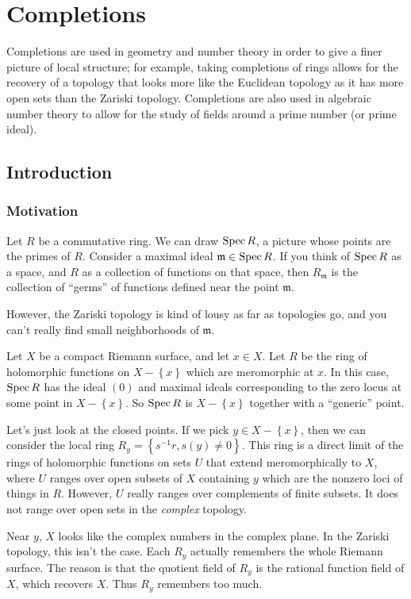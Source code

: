 \chapter{Completions}
\label{completions}

Completions are used in geometry and number theory in order to give a finer picture of local structure; for example, taking completions of rings allows for the recovery of a topology that looks more like the Euclidean topology as it has more open sets than the Zariski topology. Completions are also used in algebraic number theory to allow for the study of fields around a prime number (or prime ideal). 

\section{Introduction}

\subsection{Motivation}
Let $R$ be a commutative ring. We can draw $\operatorname{Spec} R$, a picture whose
points are the primes of $R$. Consider a maximal ideal $\mathfrak{m} \in \operatorname{Spec}
R$. If you think of $\operatorname{Spec} R$ as a space, and $R$ as a collection of functions
on that space, then $R_{\mathfrak{m}}$ is the collection of ``germs'' of
functions defined near the point $\mathfrak{m}$. 

However, the Zariski topology is kind of lousy as far as topologies go, and you can't
really find small neighborhoods of $\mathfrak{m}$.

\begin{example} 
Let $X$ be a compact Riemann surface, and let $x \in X$. Let $R$ be the ring of
holomorphic functions on $X - \left\{x\right\}$ which are meromorphic at $x$.
In this case, $\operatorname{Spec} R$ has the ideal $(0)$ and maximal ideals corresponding to
the zero locus at some point in $X - \left\{x\right\}$. So $\operatorname{Spec} R$ is $X -
\left\{x\right\}$ together with a ``generic'' point.

Let's just look at the closed points.  If we pick $y \in X - \left\{x\right\}$,
then we can consider the local ring $R_y = \left\{s^{-1}r, s(y) \neq
0\right\}$. This ring is a direct limit of the rings of holomorphic functions
on sets $U$ that extend meromorphically to $X$, where $U$ ranges over open
subsets of $X$ containing $y$ which are the nonzero loci of things in $R$. However, $U$ really ranges over complements of
finite subsets. It does not range over open sets in the \emph{complex} topology.

Near $y$, $X$ looks like the complex numbers in the complex plane. In the Zariski topology, this
isn't the case. Each $R_y$ actually remembers the whole Riemann surface. The
reason is that the quotient field of $R_y$ is the rational function field of
$X$, which recovers $X$. Thus $R_y$ remembers too much. 
\end{example} 

